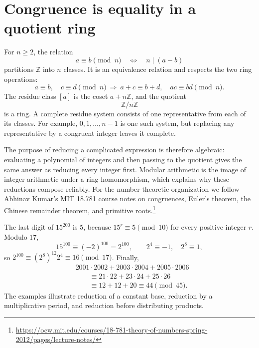 
\section{Congruence is equality in a quotient ring}

For \(n\ge2\), the relation
\[
 a\equiv b\pmod n\quad\Longleftrightarrow\quad n\mid(a-b)
\]
partitions \(\mathbb Z\) into \(n\) classes. It is an equivalence relation and respects the two ring operations:
\[
 a\equiv b,\quad c\equiv d\pmod n
 \ \Longrightarrow\ a+c\equiv b+d,\quad ac\equiv bd\pmod n.
\]
The residue class \([a]\) is the coset \(a+n\mathbb Z\), and the quotient
\[
 \mathbb Z/n\mathbb Z
\]
is a ring. A complete residue system consists of one representative from each of its classes. For example, \(0,1,\ldots,n-1\) is one such system, but replacing any representative by a congruent integer leaves it complete.

The purpose of reducing a complicated expression is therefore algebraic: evaluating a polynomial of integers and then passing to the quotient gives the same answer as reducing every integer first. Modular arithmetic is the image of integer arithmetic under a ring homomorphism, which explains why these reductions compose reliably. For the number-theoretic organization we follow Abhinav Kumar's MIT 18.781 course notes on congruences, Euler's theorem, the Chinese remainder theorem, and primitive roots.\footnote{\url{https://ocw.mit.edu/courses/18-781-theory-of-numbers-spring-2012/pages/lecture-notes/}}

\begin{example}
The last digit of \(15^{200}\) is \(5\), because \(15^r\equiv5\pmod{10}\) for every positive integer \(r\). Modulo \(17\),
\[
 15^{100}\equiv(-2)^{100}=2^{100},\qquad
 2^4\equiv-1,\quad 2^8\equiv1,
\]
so \(2^{100}\equiv(2^8)^{12}2^4\equiv16\pmod{17}\). Finally,
\[
\begin{aligned}
 &2001\cdot2002+2003\cdot2004+2005\cdot2006\\
 &\qquad\equiv21\cdot22+23\cdot24+25\cdot26\\
 &\qquad\equiv12+12+20\equiv44\pmod{45}.
\end{aligned}
\]
The examples illustrate reduction of a constant base, reduction by a multiplicative period, and reduction before distributing products.
\end{example}

